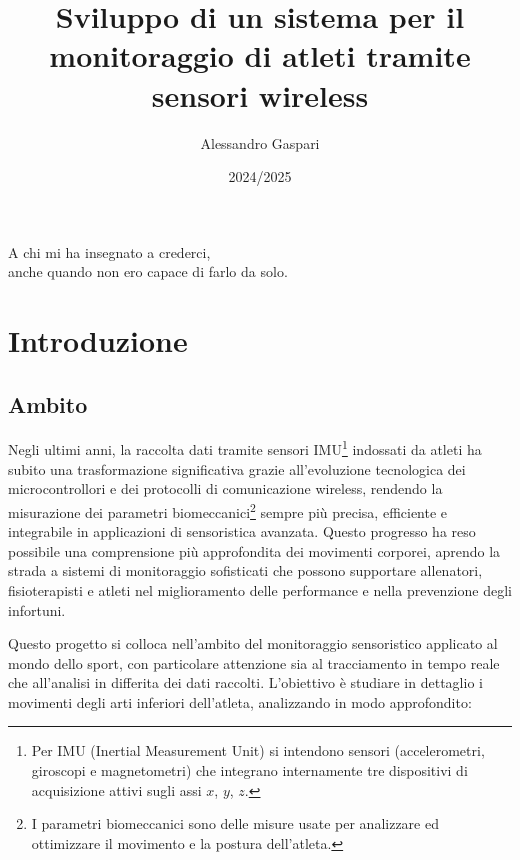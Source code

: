 \documentclass[target=bach,aauheader=,style=]{thud}
\title{Sviluppo di un sistema per il monitoraggio di atleti tramite sensori wireless}
\author{Alessandro Gaspari}
\date{2024/2025}
\begin{document}
\maketitle

\begin{dedication}
    A chi mi ha insegnato a crederci, \\
    anche quando non ero capace di farlo da solo.
\end{dedication}

\tableofcontents

\listoffigures

\mainmatter

\chapter{Introduzione}

\section{Ambito}
Negli ultimi anni, la raccolta dati tramite sensori IMU\footnote{Per IMU (Inertial Measurement Unit) si intendono sensori (accelerometri, giroscopi e magnetometri) che integrano internamente tre dispositivi di acquisizione attivi sugli assi $x$, $y$, $z$.} indossati da atleti ha subito una trasformazione significativa grazie all’evoluzione tecnologica dei microcontrollori e dei protocolli di comunicazione wireless, rendendo la misurazione dei parametri biomeccanici\footnote{I parametri biomeccanici sono delle misure usate per analizzare ed ottimizzare il movimento e la postura dell'atleta.} sempre più precisa, efficiente e integrabile in applicazioni di sensoristica avanzata. Questo progresso ha reso possibile una comprensione più approfondita dei movimenti corporei, aprendo la strada a sistemi di monitoraggio sofisticati che possono supportare allenatori, fisioterapisti e atleti nel miglioramento delle performance e nella prevenzione degli infortuni.

Questo progetto si colloca nell'ambito del monitoraggio sensoristico applicato al mondo dello sport, con particolare attenzione sia al tracciamento in tempo reale che all’analisi in differita dei dati raccolti. L'obiettivo è studiare in dettaglio i movimenti degli arti inferiori dell’atleta, analizzando in modo approfondito:
\end{document}
